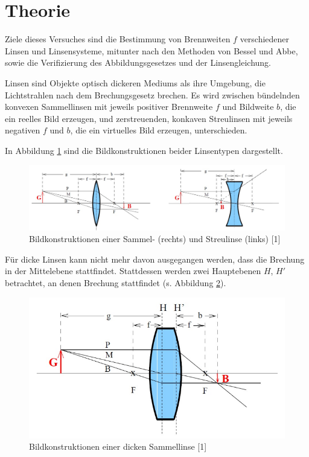 \section{Theorie}
\label{sec:Theorie}
Ziele dieses Versuches sind die Bestimmung von Brennweiten $f$ verschiedener
Linsen und Linsensysteme, mitunter nach den Methoden von Bessel und Abbe, sowie
die Verifizierung des Abbildungsgesetzes und der Linsengleichung.

Linsen sind Objekte optisch dickeren Mediums als ihre Umgebung, die Lichtstrahlen
nach dem Brechungsgesetz brechen. Es wird zwischen bündelnden konvexen Sammellinsen
mit jeweils positiver Brennweite $f$ und Bildweite $b$, die ein reelles Bild erzeugen,
und zerstreuenden, konkaven Streulinsen mit jeweils negativen $f$ und $b$, die
ein virtuelles Bild erzeugen, unterschieden.

In Abbildung \ref{fig:bild1} sind die Bildkonstruktionen beider Linsentypen dargestellt.

\begin{figure} [H]
    \centering
    \includegraphics[scale=0.35]{content/bild1.png}
    \caption{Bildkonstruktionen einer Sammel- (rechts) und Streulinse (links) [1]}
    \label{fig:bild1}
  \end{figure}

  Für dicke Linsen kann nicht mehr davon ausgegangen werden, dass die Brechung in der Mittelebene
  stattfindet. Stattdessen werden zwei Hauptebenen $H$, $H'$ betrachtet, an denen Brechung stattfindet
  (s. Abbildung \ref{fig:bild2}).

  \begin{figure} [H]
    \centering
    \includegraphics[scale=0.35]{content/bild2.png}
    \caption{Bildkonstruktionen einer dicken Sammellinse [1]}
    \label{fig:bild2}
  \end{figure}

